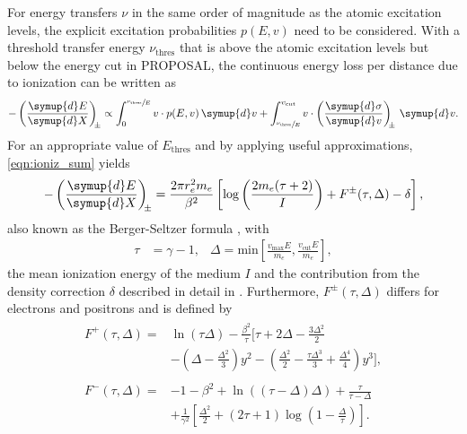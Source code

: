 For energy transfers $\nu$ in the same order of magnitude as the atomic excitation levels, the explicit excitation probabilities $p(E, v)$ need to be considered.
With a threshold transfer energy $\nu_{\text{thres}}$ that is above the atomic excitation levels but below the energy cut in PROPOSAL, the continuous energy loss per distance due to ionization can be written as
%
\begin{equation}
	\label{eqn:ioniz_sum}
	-\left(\frac{\symup{d}E}{\symup{d}X}\right)_{\!\!\pm} \propto \int_{0}^{\sfrac{\nu_{\text{thres}}}{E}} v \cdot p(E, v) \, \symup{d}v + \int_{\sfrac{\nu_{\text{thres}}}{E}}^{v_{\text{cut}}} v \cdot \left(\frac{\symup{d}\sigma}{\symup{d}v}\right)_{\!\!\pm} \, \symup{d}v. 
\end{equation}
%
For an appropriate value of $E_{\text{thres}}$ and by applying useful approximations, \eqref{eqn:ioniz_sum} yields
%
\begin{equation}
	- \left(\frac{\symup{d}E}{\symup{d}X}\right)_{\!\!\pm} = \frac{2 \pi r_e^2 m_e}{\beta^2} \left[ \log{\left( \frac{2 m_e (\tau + 2)}{I} \right) + F^{\pm}(\tau, \Delta) - \delta } \right],
\end{equation}
%
also known as the Berger-Seltzer formula \cite{Hirayama:2005zm}, with
%
\begin{align}
	\tau &= \gamma - 1, & \Delta = \text{min}\left[ \frac{v_{\text{max}} E}{m_e}, \frac{v_{\text{cut}} E}{m_e} \right],
\end{align}
%
the mean ionization energy of the medium $I$ and the contribution from the density correction $\delta$ described in detail in \cite{Kohne:2013zbq}.
Furthermore, $F^{\pm}(\tau, \Delta)$ differs for electrons and positrons and is defined by
\begin{align}
	\begin{split}
	F^{+}(\tau, \Delta) = &\ln\left(\tau \Delta \right) - \frac{\beta^2}{\tau} \biggl[ \tau + 2 \Delta - \frac{3 \Delta^2 }{2} \\ &- (\Delta - \frac{\Delta^2}{3}) y^2 - ( \frac{\Delta^2}{2} - \frac{\tau\Delta^3}{3} + \frac{\Delta^4}{4} ) y^3 \biggr],
	\end{split}
	\\[2ex]
	\begin{split}
	F^{-}(\tau, \Delta) = &-1 - \beta^2 + \ln\left( (\tau - \Delta) \Delta \right) + \frac{\tau}{\tau - \Delta} \\ &+ \frac{1}{\gamma^2} \left[ \frac{\Delta^2}{2} + (2 \tau + 1) \log\left( 1 - \frac{\Delta}{\tau} \right) \right].
	\end{split}
\end{align}

